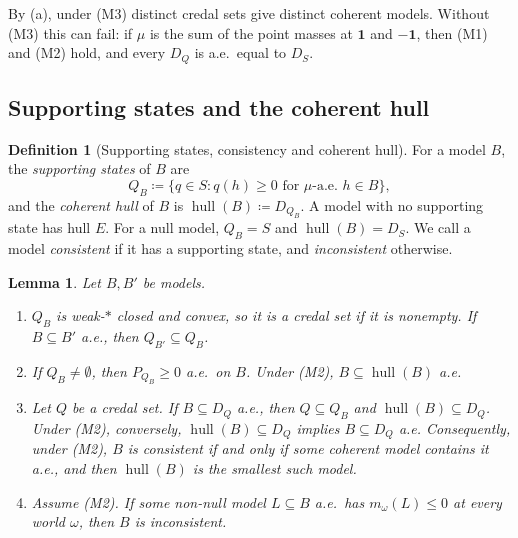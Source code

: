 \documentclass[11pt]{article}
\newcommand{\one}{\mathbf{1}}
\newcommand{\hull}{\operatorname{hull}}
\theoremstyle{plain}
\newtheorem{lemma}[theorem]{Lemma}
\theoremstyle{definition}
\newtheorem{definition}[theorem]{Definition}
\theoremstyle{remark}
\begin{document}
By (a), under (M3) distinct credal sets give distinct coherent models. Without (M3) this can
fail: if $\mu$ is the sum of the point masses at $\one$ and $-\one$, then (M1) and (M2) hold,
and every $D_Q$ is a.e.\ equal to $D_S$.

\subsection{Supporting states and the coherent hull}

\begin{definition}[Supporting states, consistency and coherent hull]\label{def:hull}
For a model $B$, the \emph{supporting states} of $B$ are
\[
  Q_B\coloneqq\{q\in S:q(h)\ge0\text{ for $\mu$-a.e.\ }h\in B\},
\]
and the \emph{coherent hull} of $B$ is $\hull(B)\coloneqq D_{Q_B}$. A model with no supporting
state has hull $E$. For a null model, $Q_B=S$ and $\hull(B)=D_S$. We call a model
\emph{consistent} if it has a supporting state, and \emph{inconsistent} otherwise.
\end{definition}

\begin{lemma}\label{lem:hull}
Let $B,B'$ be models.
\begin{enumerate}[label=(\alph*)]
  \item $Q_B$ is weak-$\ast$ closed and convex, so it is a credal set if it is nonempty. If
  $B\subseteq B'$ a.e., then $Q_{B'}\subseteq Q_B$.
  \item If $Q_B\ne\emptyset$, then $P_{Q_B}\ge0$ a.e.\ on $B$. Under (M2), $B\subseteq
  \hull(B)$ a.e.
  \item Let $Q$ be a credal set. If $B\subseteq D_Q$ a.e., then $Q\subseteq Q_B$ and
  $\hull(B)\subseteq D_Q$. Under (M2), conversely, $\hull(B)\subseteq D_Q$ implies
  $B\subseteq D_Q$ a.e. Consequently, under (M2), $B$ is consistent if and only if some
  coherent model contains it a.e., and then $\hull(B)$ is the smallest such model.
  \item Assume (M2). If some non-null model $L\subseteq B$ a.e.\ has $m_\omega(L)\le0$ at
  every world $\omega$, then $B$ is inconsistent.
\end{enumerate}
\end{lemma}
\end{document}
